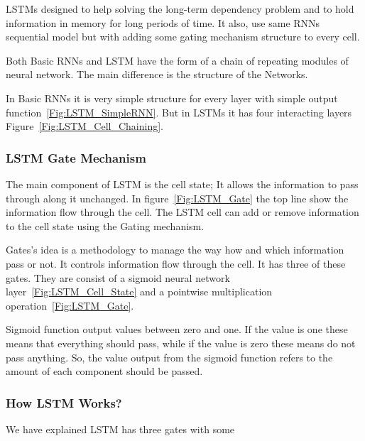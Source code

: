 LSTMs designed to help solving the long-term dependency problem and to hold information in memory for long periods of time. It also, use same RNNs sequential model but with adding some gating mechanism structure to every cell.

Both Basic RNNs and LSTM have the form of a chain of repeating modules of neural network. The main difference is the structure of the Networks.%


In Basic RNNs it is very simple structure for every layer with simple output function~\ref{Fig:LSTM_SimpleRNN}. But in LSTMs it has four interacting layers Figure~\ref{Fig:LSTM_Cell_Chaining}.%

\subsubsection{LSTM Gate Mechanism}

The main component of LSTM is the cell state; It allows the information to pass through along it unchanged. In figure~\ref{Fig:LSTM_Gate} the top line show the information flow through the cell. The LSTM cell can add or remove information to the cell state using the Gating mechanism. 

Gates's idea is a methodology to manage the way how and which information pass or not. It controls information flow through the cell. It has three of these gates. They are consist of a sigmoid neural network layer~\ref{Fig:LSTM_Cell_State} and a pointwise multiplication operation~\ref{Fig:LSTM_Gate}.

Sigmoid function output values between zero and one. If the value is one these means that everything should pass, while if the value is zero these means do not pass anything. So, the value output from the sigmoid function refers to the amount of each component should be passed.%

\subsubsection{How LSTM Works?}

We have explained LSTM has three gates with some 

